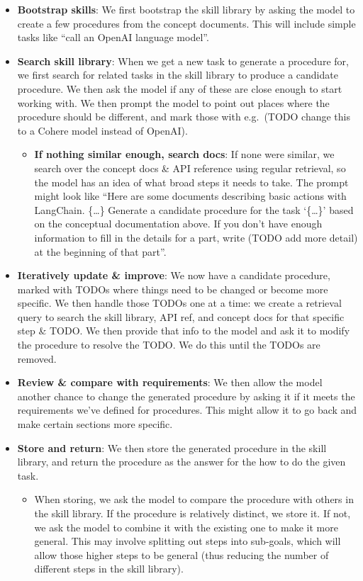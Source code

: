 \documentclass{article}
\begin{document}
\begin{itemize}
   \item \textbf{Bootstrap skills}: We first bootstrap the skill library by asking the model to create a few procedures from the concept documents. This will include simple tasks like ``call an OpenAI language model''.
   \item \textbf{Search skill library}: When we get a new task to generate a procedure for, we first search for related tasks in the skill library to produce a candidate procedure. We then ask the model if any of these are close enough to start working with. We then prompt the model to point out places where the procedure should be different, and mark those with e.g.~(TODO change this to a Cohere model instead of OpenAI).
         \begin{itemize}
            \item \textbf{If nothing similar enough, search docs}: If none were similar, we search over the concept docs \& API reference using regular retrieval, so the model has an idea of what broad steps it needs to take. The prompt might look like ``Here are some documents describing basic actions with LangChain. \{\ldots\} Generate a candidate procedure for the task `\{\ldots\}' based on the conceptual documentation above. If you don't have enough information to fill in the details for a part, write (TODO add more detail) at the beginning of that part''.
         \end{itemize}
   \item \textbf{Iteratively update \& improve}: We now have a candidate procedure, marked with TODOs where things need to be changed or become more specific. We then handle those TODOs one at a time: we create a retrieval query to search the skill library, API ref, and concept docs for that specific step \& TODO. We then provide that info to the model and ask it to modify the procedure to resolve the TODO. We do this until the TODOs are removed.
   \item \textbf{Review \& compare with requirements}: We then allow the model another chance to change the generated procedure by asking it if it meets the requirements we've defined for procedures. This might allow it to go back and make certain sections more specific.
   \item \textbf{Store and return}: We then store the generated procedure in the skill library, and return the procedure as the answer for the how to do the given task.
         \begin{itemize}
            \item When storing, we ask the model to compare the procedure with others in the skill library. If the procedure is relatively distinct, we store it. If not, we ask the model to combine it with the existing one to make it more general. This may involve splitting out steps into sub-goals, which will allow those higher steps to be general (thus reducing the number of different steps in the skill library).
         \end{itemize}
\end{itemize}
\end{document}
